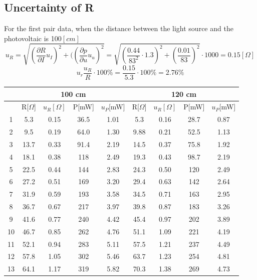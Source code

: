 \documentclass[12pt]{article}
\begin{document}
\subsection{Uncertainty of R}
For the first pair data, when the distance between the light source and the photovoltaic is 100$[cm]$
$$u_R=\sqrt{(\frac{\partial R}{\partial I}u_I)^2+((\frac{\partial p}{\partial u}u_u)^2}=\sqrt{(\frac{0.44}{83^2}\cdot1.3)^2+(\frac{0.01}{83})^2}\cdot1000=0.15[\Omega]$$
$$u_r\frac{u_R}{R}\cdot100\%=\frac{0.15}{5.3}\cdot100\%=2.76\%$$
\begin{table}[H]
\centering
\begin{tabular}{|c|c|c|c|c|c|c|c|c|}
\hline
   & \multicolumn{4}{c|}{100 cm}      & \multicolumn{4}{c|}{120 cm}      \\ \hline
   & R[$\Omega$]     &$u_R [\Omega]$  &P[mW] &$u_P$[mW]     & R[$\Omega$]     & $u_R [\Omega]$     &P[mW]&$u_P$[mW]    \\ \hline 
1  & 5.3         & 0.15   &36.5&1.01     & 5.3         & 0.16     &28.7 &0.87   \\ \hline
2  & 9.5         & 0.19   &64.0&1.30     & 9.88        & 0.21     &52.5 &1.13    \\ \hline
3  & 13.7        & 0.33   &91.4&2.19     & 14.5        & 0.37     &75.8 &1.92    \\ \hline
4  & 18.1        & 0.38   &118 &2.49     & 19.3        & 0.43     &98.7 &2.19    \\ \hline
5  & 22.5        & 0.44   &144 &2.83     & 24.3        & 0.50     &120  &2.49    \\ \hline
6  & 27.2        & 0.51   &169 &3.20     & 29.4        & 0.63     &142  &2.64    \\ \hline
7  & 31.9        & 0.59   &193 &3.58     & 34.5        & 0.71     &163  &2.95    \\ \hline
8  & 36.7        & 0.67   &217 &3.97     & 39.8        & 0.87     &183  &3.26    \\ \hline
9  & 41.6        & 0.77   &240 &4.42     & 45.4        & 0.97     &202  &3.89    \\ \hline
10 & 46.7        & 0.85   &262 &4.76     & 51.1        & 1.09     &221  &4.19    \\ \hline
11 & 52.1        & 0.94   &283 &5.11     & 57.5        & 1.21     &237  &4.49    \\ \hline
12 & 57.8        & 1.05   &302 &5.46     & 63.7        & 1.23     &254  &4.81    \\ \hline
13 & 64.1        & 1.17   &319 &5.82     & 70.3        & 1.38     &269  &4.73    \\ \hline

\end{tabular}
\end{table}
\end{document}
